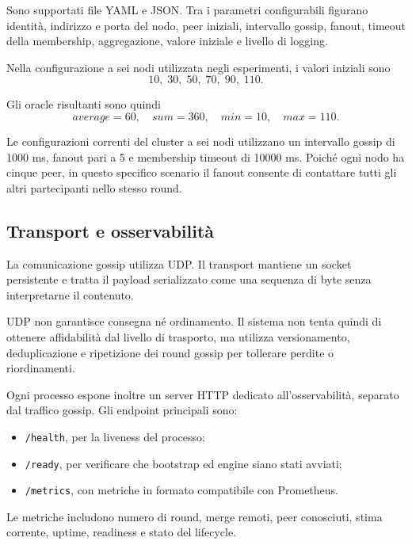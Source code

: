 \documentclass[conference]{IEEEtran}
\begin{document}
Sono supportati file YAML e JSON. Tra i parametri configurabili figurano identità, indirizzo e porta del nodo, peer iniziali, intervallo gossip, fanout, timeout della membership, aggregazione, valore iniziale e livello di logging.

Nella configurazione a sei nodi utilizzata negli esperimenti, i valori iniziali sono
\begin{equation}
10,\;30,\;50,\;70,\;90,\;110.
\end{equation}

Gli oracle risultanti sono quindi
\begin{equation}
average=60,\quad sum=360,\quad min=10,\quad max=110.
\end{equation}

Le configurazioni correnti del cluster a sei nodi utilizzano un intervallo gossip di 1000 ms, fanout pari a 5 e membership timeout di 10000 ms. Poiché ogni nodo ha cinque peer, in questo specifico scenario il fanout consente di contattare tutti gli altri partecipanti nello stesso round.

\subsection{Transport e osservabilità}

La comunicazione gossip utilizza UDP. Il transport mantiene un socket persistente e tratta il payload serializzato come una sequenza di byte senza interpretarne il contenuto.

UDP non garantisce consegna né ordinamento. Il sistema non tenta quindi di ottenere affidabilità dal livello di trasporto, ma utilizza versionamento, deduplicazione e ripetizione dei round gossip per tollerare perdite o riordinamenti.

Ogni processo espone inoltre un server HTTP dedicato all'osservabilità, separato dal traffico gossip. Gli endpoint principali sono:

\begin{itemize}
    \item \texttt{/health}, per la liveness del processo;
    \item \texttt{/ready}, per verificare che bootstrap ed engine siano stati avviati;
    \item \texttt{/metrics}, con metriche in formato compatibile con Prometheus.
\end{itemize}

Le metriche includono numero di round, merge remoti, peer conosciuti, stima corrente, uptime, readiness e stato del lifecycle.
\end{document}
